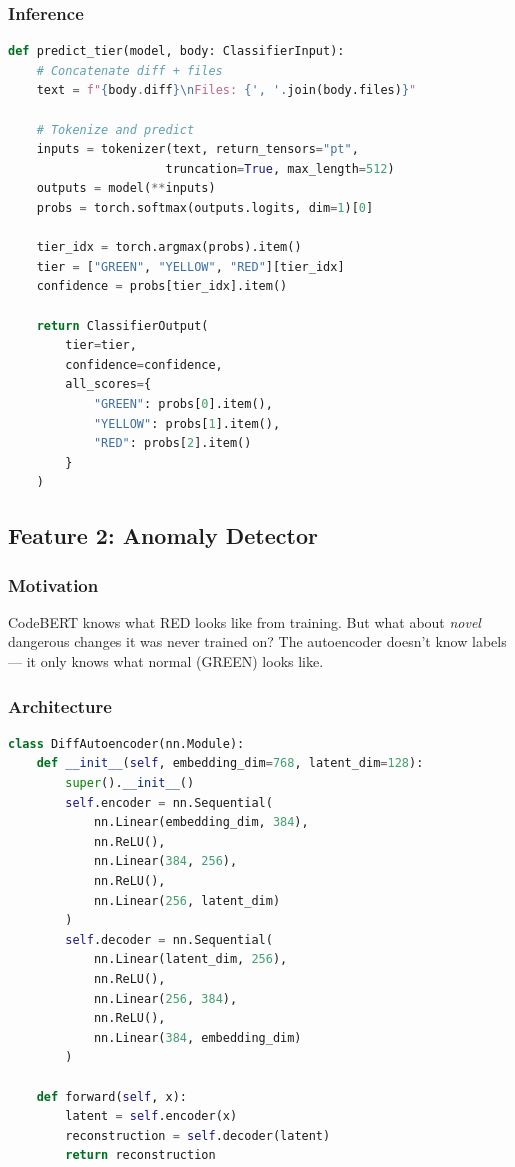\documentclass[11pt,a4paper]{article}
\begin{document}
\subsubsection{Inference}
\begin{lstlisting}[language=Python,caption=Classifier Inference (classify.py)]
def predict_tier(model, body: ClassifierInput):
    # Concatenate diff + files
    text = f"{body.diff}\nFiles: {', '.join(body.files)}"
    
    # Tokenize and predict
    inputs = tokenizer(text, return_tensors="pt", 
                      truncation=True, max_length=512)
    outputs = model(**inputs)
    probs = torch.softmax(outputs.logits, dim=1)[0]
    
    tier_idx = torch.argmax(probs).item()
    tier = ["GREEN", "YELLOW", "RED"][tier_idx]
    confidence = probs[tier_idx].item()
    
    return ClassifierOutput(
        tier=tier,
        confidence=confidence,
        all_scores={
            "GREEN": probs[0].item(),
            "YELLOW": probs[1].item(),
            "RED": probs[2].item()
        }
    )
\end{lstlisting}

\subsection{Feature 2: Anomaly Detector}

\subsubsection{Motivation}
CodeBERT knows what RED looks like from training. But what about \textit{novel} dangerous changes it was never trained on? The autoencoder doesn't know labels --- it only knows what normal (GREEN) looks like.

\subsubsection{Architecture}
\begin{lstlisting}[language=Python,caption=Autoencoder (anomaly.py)]
class DiffAutoencoder(nn.Module):
    def __init__(self, embedding_dim=768, latent_dim=128):
        super().__init__()
        self.encoder = nn.Sequential(
            nn.Linear(embedding_dim, 384),
            nn.ReLU(),
            nn.Linear(384, 256),
            nn.ReLU(),
            nn.Linear(256, latent_dim)
        )
        self.decoder = nn.Sequential(
            nn.Linear(latent_dim, 256),
            nn.ReLU(),
            nn.Linear(256, 384),
            nn.ReLU(),
            nn.Linear(384, embedding_dim)
        )
    
    def forward(self, x):
        latent = self.encoder(x)
        reconstruction = self.decoder(latent)
        return reconstruction
\end{lstlisting}
\end{document}
